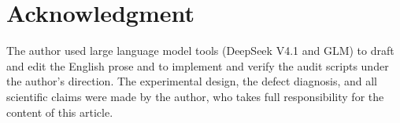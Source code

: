\documentclass[conference]{IEEEtran}
\begin{document}
\section*{Acknowledgment}
The author used large language model tools (DeepSeek V4.1 and GLM) to draft and edit the English
prose and to implement and verify the audit scripts under the author's direction. The experimental
design, the defect diagnosis, and all scientific claims were made by the author, who takes full
responsibility for the content of this article.



\end{document}

